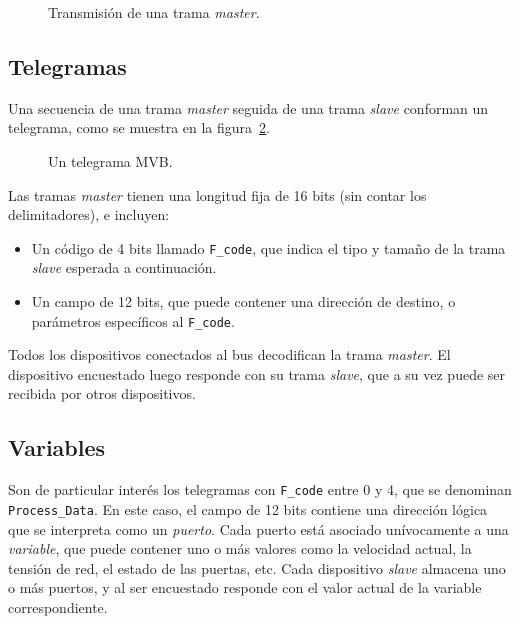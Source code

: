 \begin{figure}[htbp]
	\centering
    {
        \fontsize{8pt}{8pt}\selectfont
        
    }
	\caption[Transmisión de una trama master]{Transmisión de una trama \textit{master}.}
    \label{fig:manchester}
\end{figure}


\subsection{Telegramas}

Una secuencia de una trama \textit{master} seguida de una trama \textit{slave} conforman un telegrama, como se muestra en la figura~\ref{fig:telegrama}.

\begin{figure}[htbp]
	\centering
    {
        \fontsize{8pt}{8pt}\selectfont
        
    }
	\caption[Un telegrama MVB]{Un telegrama MVB.}
    \label{fig:telegrama}
\end{figure}

Las tramas \textit{master} tienen una longitud fija de 16 bits (sin contar los delimitadores), e incluyen:

\begin{itemize}
\item Un código de 4 bits llamado \texttt{F\_code}, que indica el tipo y tamaño de la trama \textit{slave} esperada a continuación.
\item Un campo de 12 bits, que puede contener una dirección de destino, o parámetros específicos al \texttt{F\_code}.
\end{itemize}

Todos los dispositivos conectados al bus decodifican la trama \textit{master}. El dispositivo encuestado luego responde con su trama \textit{slave}, que a su vez puede ser recibida por otros dispositivos.

\subsection{Variables}

Son de particular interés los telegramas con \texttt{F\_code} entre 0 y 4, que se denominan \texttt{Process\_Data}. En este caso, el campo de 12 bits contiene una dirección lógica que se interpreta como un \textit{puerto}. Cada puerto está asociado unívocamente a una \textit{variable}, que puede contener uno o más valores como la velocidad actual, la tensión de red, el estado de las puertas, etc. Cada dispositivo \textit{slave} almacena uno o más puertos, y al ser encuestado responde con el valor actual de la variable correspondiente.

